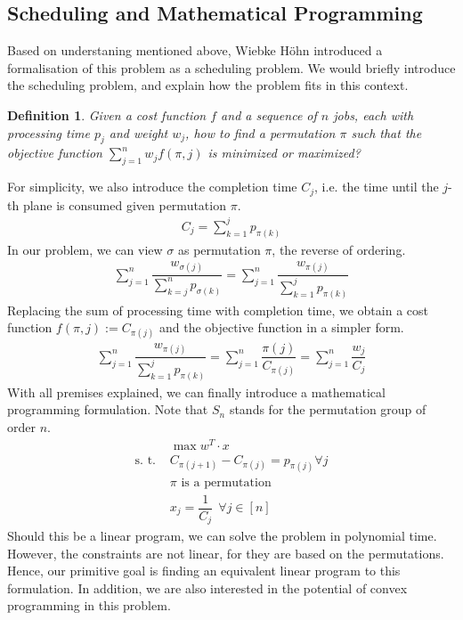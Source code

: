 \documentclass[12pt,letterpaper]{article}
\newtheorem{definition}[theorem]{Definition}
\begin{document}
\subsection{Scheduling and Mathematical Programming}
Based on understaning mentioned above, Wiebke Höhn introduced a formalisation of this problem as a scheduling problem. \cite{hohn2015performance}
We would briefly introduce the scheduling problem, and explain how the problem fits in this context. 
\begin{definition}
    Given a cost function $f$ and a sequence of $n$ jobs, each with processing time $p_j$ and weight $w_j$, how to find a permutation $\pi$
    such that the objective function $\sum_{j = 1}^{n} w_j f(\pi, j)$ is minimized or maximized? 
\end{definition}
For simplicity, we also introduce the completion time $C_j$, i.e. the time until the $j$-th plane is consumed given permutation $\pi$.
\begin{align*}
    C_j = \sum_{k = 1}^j p_{\pi(k)}
\end{align*}
In our problem, we can view $\sigma$ as permutation $\pi$, the reverse of ordering.
\begin{align*}
    \sum_{j=1}^{n} \dfrac{w_{\sigma(j)}}{\sum_{k = j}^n p_{\sigma(k)}} = \sum_{j = 1}^n \dfrac{w_{\pi(j)}}{\sum_{k = 1}^j p_{\pi(k)}}
\end{align*}
Replacing the sum of processing time with completion time, we obtain a cost function $f(\pi, j) := C_{\pi(j)}$
and the objective function in a simpler form.
\begin{align*}
    \sum_{j = 1}^n \dfrac{w_{\pi(j)}}{\sum_{k = 1}^j p_{\pi(k)}} = \sum_{j = 1}^n \dfrac{\pi(j)}{C_{\pi(j)}} =  \sum_{j = 1}^n \dfrac{w_{j}}{C_j}
\end{align*}
With all premises explained, we can finally introduce a mathematical programming formulation. Note that $S_n$ stands for the permutation group of order $n$. 
\begin{align*}
    &\max w^T \cdot x \label{eq:linobj} \tag{B} \\ 
    \text{s. t.\ }& C_{\pi(j+1)} - C_{\pi(j)} = p_{\pi(j)} \forall j \\
    & \pi \text{ is a permutation} \\ 
    & x_j = \dfrac{1}{C_j} \ \ \forall j \in [n] 
\end{align*}
Should this be a linear program, we can solve the problem in polynomial time. 
However, the constraints are not linear, for they are based on the permutations.
Hence, our primitive goal is finding an equivalent linear program to this formulation. In addition, 
we are also interested in the potential of convex programming in this problem. 
\end{document}
